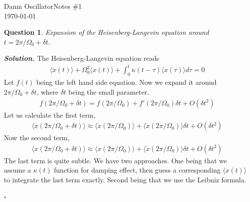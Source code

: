 \documentclass[12pt]{article}
\newtheorem{question}{Question}
\newenvironment{solution}[1][\it{Solution}]{\textbf{#1. } }{$\square$}
\begin{document}
\noindent Damn Oscillator\hfill Notes \#1\\
\today

\hrulefill


\begin{question}
Expansion of the Heisenberg-Langevin equation around $t = 2\pi/\Omega_0+\delta t$.
\end{question}
\begin{solution}
The Heisenberg-Langevin equation reads
\begin{align}
    \langle\ddot{x}(t)\rangle + \Omega_0^2\langle x(t)\rangle + \int_0^t \dot{\kappa}(t-\tau)\langle x(\tau)\rangle d\tau = 0
\end{align}
Let $f(t)$ being the left hand side equation. Now we expand it around $2\pi/\Omega_0+\delta t$, where $\delta t$ being the small parameter.
\begin{align}
    f(2\pi/\Omega_0 + \delta t) = f(2\pi/\Omega_0) + f'(2\pi/\Omega_0)\delta t + O(\delta t^2)
\end{align}
Let us calculate the first term, 
\begin{align}
    \langle\ddot{x}(2\pi/\Omega_0 + \delta t)\rangle \approx \langle \ddot{x}(2\pi/\Omega_0)\rangle + \langle \dddot{x}(2\pi/\Omega_0)\rangle \delta t + O(\delta t^2)
\end{align}
Now the second term,
\begin{align}
    \langle {x}(2\pi/\Omega_0 + \delta t)\rangle \approx \langle {x}(2\pi/\Omega_0)\rangle + \langle \dot{x}(2\pi/\Omega_0)\rangle \delta t + O(\delta t^2)
\end{align}
The last term is quite subtle. We have two approaches. One being that we assume a $\kappa(t)$ function for damping effect, then guess a corresponding $\langle x(t)\rangle$ to integrate the last term exactly. Second being that we use the Leibniz formula.


\end{solution}
\end{document}
